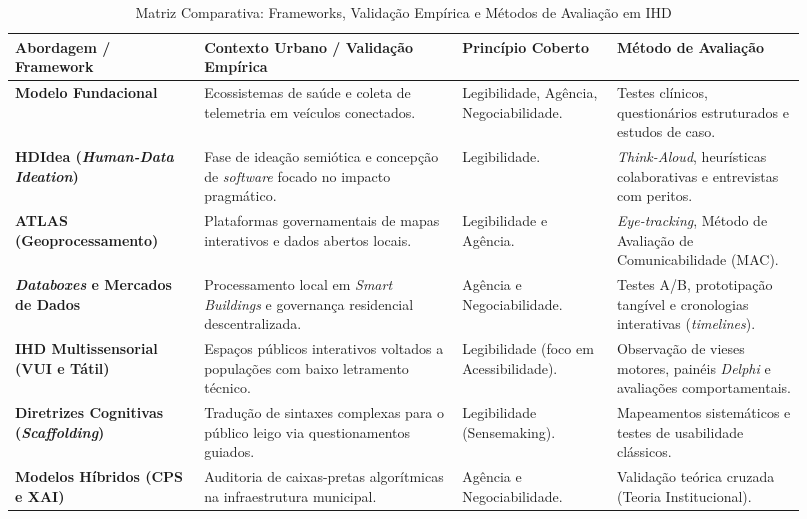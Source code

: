 \documentclass[12pt]{article}
\begin{document}
{{\begin{table}[H] %
\centering
\caption{Matriz Comparativa: Frameworks, Validação Empírica e Métodos de Avaliação em IHD}
\label{tab:matriz_frameworks}
\small
\renewcommand{\arraystretch}{1.3}
\begin{tabular}{
  >{\raggedright\arraybackslash}p{0.22\linewidth} 
  >{\raggedright\arraybackslash}p{0.30\linewidth} 
  >{\raggedright\arraybackslash}p{0.18\linewidth} 
  >{\raggedright\arraybackslash}p{0.22\linewidth}
}
\toprule
\textbf{Abordagem / Framework} & \textbf{Contexto Urbano / Validação Empírica} & \textbf{Princípio Coberto} & \textbf{Método de Avaliação} \\ \midrule
\textbf{Modelo Fundacional \cite{mortier2015humandatainteractionhumanface}} & Ecossistemas de saúde e coleta de telemetria em veículos conectados. & Legibilidade, Agência, Negociabilidade. & Testes clínicos, questionários estruturados e estudos de caso. \\ \addlinespace
\textbf{HDIdea (\textit{Human-Data Ideation})} & Fase de ideação semiótica e concepção de \textit{software} focado no impacto pragmático. & Legibilidade. & \textit{Think-Aloud}, heurísticas colaborativas e entrevistas com peritos. \\ \addlinespace
\textbf{ATLAS (Geoprocessamento)} & Plataformas governamentais de mapas interativos e dados abertos locais. & Legibilidade e Agência. & \textit{Eye-tracking}, Método de Avaliação de Comunicabilidade (MAC). \\ \addlinespace
\textbf{\textit{Databoxes} e Mercados de Dados} & Processamento local em \textit{Smart Buildings} e governança residencial descentralizada. & Agência e Negociabilidade. & Testes A/B, prototipação tangível e cronologias interativas (\textit{timelines}). \\ \addlinespace
\textbf{IHD Multissensorial (VUI e Tátil)} & Espaços públicos interativos voltados a populações com baixo letramento técnico. & Legibilidade (foco em Acessibilidade). & Observação de vieses motores, painéis \textit{Delphi} e avaliações comportamentais. \\ \addlinespace
\textbf{Diretrizes Cognitivas (\textit{Scaffolding})} & Tradução de sintaxes complexas para o público leigo via questionamentos guiados. & Legibilidade (Sensemaking). & Mapeamentos sistemáticos e testes de usabilidade clássicos. \\ \addlinespace
\textbf{Modelos Híbridos (CPS e XAI)} & Auditoria de caixas-pretas algorítmicas na infraestrutura municipal. & Agência e Negociabilidade. & Validação teórica cruzada (Teoria Institucional). \\ \bottomrule
\end{tabular}
\end{table}

}}
\end{document}
